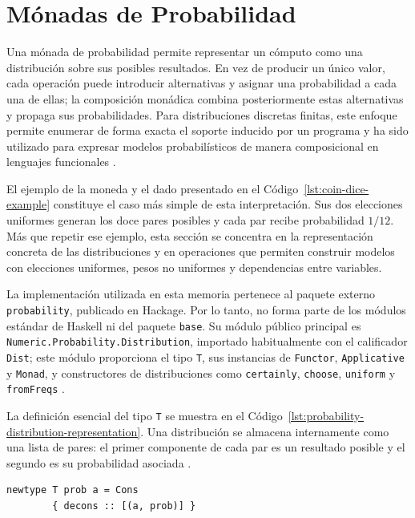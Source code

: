 
\section{Mónadas de Probabilidad}

Una mónada de probabilidad permite representar un cómputo como una distribución sobre sus posibles resultados. En vez de producir un único valor, cada operación puede introducir alternativas y asignar una probabilidad a cada una de ellas; la composición monádica combina posteriormente estas alternativas y propaga sus probabilidades. Para distribuciones discretas finitas, este enfoque permite enumerar de forma exacta el soporte inducido por un programa y ha sido utilizado para expresar modelos probabilísticos de manera composicional en lenguajes funcionales \cite{ErwigKollmansberger2006,ScibiorGG2015}.

El ejemplo de la moneda y el dado presentado en el Código~\ref{lst:coin-dice-example} constituye el caso más simple de esta interpretación. Sus dos elecciones uniformes generan los doce pares posibles y cada par recibe probabilidad $1/12$. Más que repetir ese ejemplo, esta sección se concentra en la representación concreta de las distribuciones y en operaciones que permiten construir modelos con elecciones uniformes, pesos no uniformes y dependencias entre variables.

La implementación utilizada en esta memoria pertenece al paquete externo \texttt{probability}, publicado en Hackage. Por lo tanto, no forma parte de los módulos estándar de \textsf{Haskell} ni del paquete \texttt{base}. Su módulo público principal es \texttt{Numeric.Probability.Distribution}, importado habitualmente con el calificador \texttt{Dist}; este módulo proporciona el tipo \texttt{T}, sus instancias de \texttt{Functor}, \texttt{Applicative} y \texttt{Monad}, y constructores de distribuciones como \texttt{certainly}, \texttt{choose}, \texttt{uniform} y \texttt{fromFreqs} \cite{HackageProbabilityDistribution}.

La definición esencial del tipo \texttt{T} se muestra en el Código~\ref{lst:probability-distribution-representation}. Una distribución se almacena internamente como una lista de pares: el primer componente de cada par es un resultado posible y el segundo es su probabilidad asociada \cite{HackageProbabilityDistribution}.

\begin{lstlisting}[style=haskell,caption={Representación interna de una distribución dentro del paquete \texttt{probability}.},label={lst:probability-distribution-representation}]
    newtype T prob a = Cons
        { decons :: [(a, prob)] }
\end{lstlisting}

